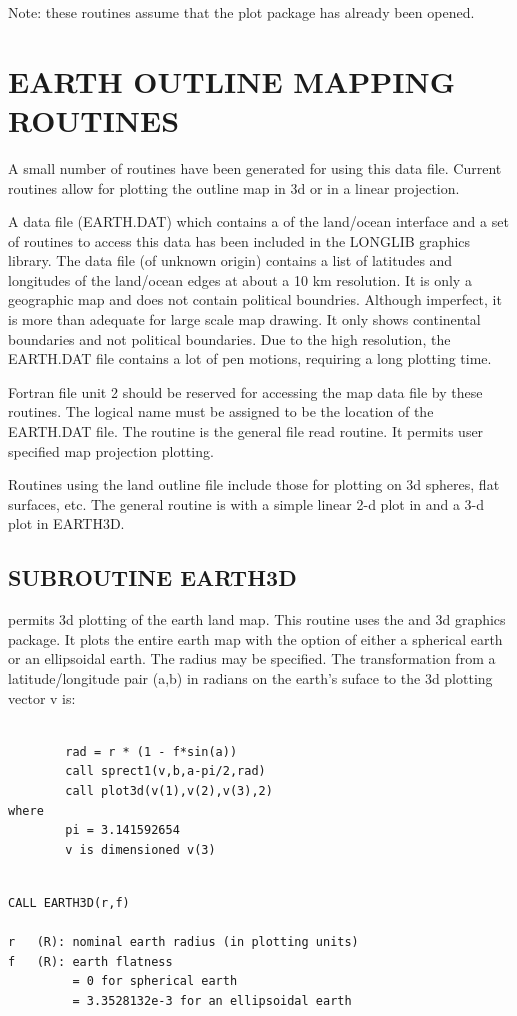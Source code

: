 \documentclass[11pt]{report}
\begin{document}
Note: these routines assume that the plot package has already been opened.

\section{EARTH OUTLINE MAPPING ROUTINES}

A small number of routines have been generated for using this data
file.  Current routines allow for plotting the  outline map
in 3d or in a linear projection.

A data file (EARTH.DAT) which contains a  of the land/ocean
interface and a set of routines to access this data has been included
in the LONGLIB graphics library.  The data file (of unknown origin)
contains a list of latitudes and longitudes of the land/ocean edges at
about a 10 km resolution.  It is only a geographic map and does not
contain political boundries.  Although imperfect, it is more than
adequate for large scale map drawing.  It only shows continental
boundaries and not political boundaries.  Due to the high resolution,
the EARTH.DAT file contains a lot of pen motions, requiring a long
plotting time.

Fortran file unit 2 should be reserved for accessing the map data file
by these routines.  The logical name  must be assigned to
be the location of the EARTH.DAT file.  The routine  is the
general file read routine.  It permits user specified map projection
plotting.

Routines using the land outline file include those for plotting on
3d spheres, flat surfaces, etc.  The general routine is  with
a simple linear 2-d plot in  and a 3-d plot in EARTH3D.

\subsection{SUBROUTINE EARTH3D}

 permits 3d plotting of the earth land map.  This routine
uses the  and  3d graphics package.  It plots
the entire earth map with the option of either a spherical earth or an
ellipsoidal earth.  The radius may be specified.  The transformation
from a latitude/longitude pair (a,b) in radians on the earth's suface
to the 3d plotting vector v is:
\begin{verbatim}

        rad = r * (1 - f*sin(a))
        call sprect1(v,b,a-pi/2,rad)
        call plot3d(v(1),v(2),v(3),2)
where
        pi = 3.141592654
        v is dimensioned v(3)
\end{verbatim}
\begin{verbatim}

CALL EARTH3D(r,f)

r   (R): nominal earth radius (in plotting units)
f   (R): earth flatness
         = 0 for spherical earth
         = 3.3528132e-3 for an ellipsoidal earth
\end{verbatim}
\end{document}
